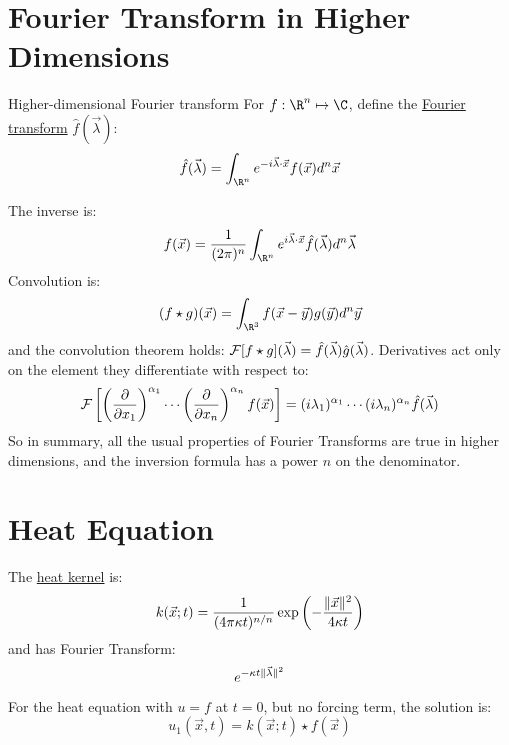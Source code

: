 \documentclass[../Main.tex]{subfiles}
\begin{document}
\section{Fourier Transform in Higher Dimensions}
\begin{definition}{Higher-dimensional Fourier transform}
    For $f : \R^n \mapsto \C$, define the \underline{Fourier transform} $\hat{f}(\vec{\lambda})$:
    \begin{equation*}
        \hat{f}(\vec{\lambda}) = \int_{\R^n} e^{-i \vec{\lambda} \cdot \vec{x}} f(\vec{x}) d^n \vec{x}
    \end{equation*}
\end{definition}
The inverse is:
\begin{equation*}
    f(\vec{x}) = \frac{1}{(2\pi)^n} \int_{\R^n} e^{i \vec{\lambda} \cdot \vec{x}} \hat{f}(\vec{\lambda}) d^n\vec{\lambda}
\end{equation*}
Convolution is:
\begin{equation*}
    (f \star g)(\vec{x}) = \int_{\R^3} f(\vec{x} - \vec{y}) g(\vec{y}) d^n\vec{y}
\end{equation*}
and the convolution theorem holds: $\mathcal{F}[f \star g](\vec{\lambda}) = \hat{f}(\vec{\lambda}) \hat{g}(\vec{\lambda})$. Derivatives act only on the element they differentiate with respect to:
\begin{equation*}
    \mathcal{F}\left[\left(\frac{\partial}{\partial x_1}\right)^{\alpha_1} \cdots \left(\frac{\partial}{\partial x_n}\right)^{\alpha_n}f(\vec{x})\right] = (i\lambda_1)^{\alpha_1} \cdots (i\lambda_n)^{\alpha_n} \hat{f}(\vec{\lambda})
\end{equation*}
So in summary, all the usual properties of Fourier Transforms are true in higher dimensions, and the inversion formula has a power $n$ on the denominator.
\section{Heat Equation}
The \underline{heat kernel} is:
\begin{equation*}
    k(\vec{x};t) = \frac{1}{(4\pi \kappa t)^{n / n}}\exp\left(-\frac{\lVert\vec{x}\rVert^2}{4\kappa t}\right)
\end{equation*}
and has Fourier Transform:
\begin{equation*}
    e^{-\kappa t \lVert\vec{\lambda}\rVert^2}
\end{equation*}
For the heat equation with $u = f$ at $t = 0$, but no forcing term, the solution is:
\begin{equation*}
    u_1(\vec{x}, t) = k(\vec{x};t) \star f(\vec{x})
\end{equation*}
\end{document}
